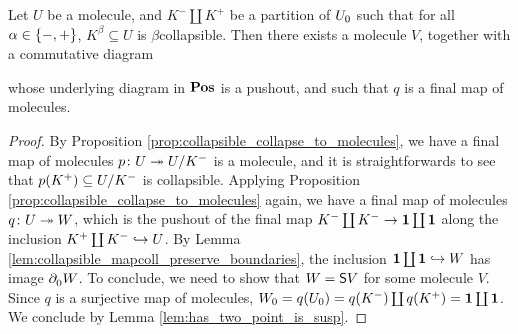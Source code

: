 \begin{prop} \label{prop:desuspension}
    Let \( U \) be a molecule, and \( K^- \coprod K^+ \) be a partition of \( \gr{0}{U} \) such that for all \( \a \in \set{-, +} \), \( K^\beta \subseteq U \) is \( \beta \)\nbd collapsible.
    Then there exists a molecule \( V \), together with a commutative diagram
    \begin{center}
    \end{center}
    whose underlying diagram in \( \Pos \) is a pushout, and such that \( q \) is a final map of molecules.
\end{prop}
\begin{proof}
    By Proposition \ref{prop:collapsible_collapse_to_molecules}, we have a final map of molecules \( p \colon U \surj \coll{K^-}{U} \) is a molecule, and it is straightforwards to see that \( p(K^+) \subseteq \coll{K^-}{U} \) is collapsible.
    Applying Proposition \ref{prop:collapsible_collapse_to_molecules} again, we have a final map of molecules \( q \colon U \surj W \), which is the pushout of the final map \( K^- \coprod K^- \to \pt \coprod \pt \) along the inclusion \( K^+ \coprod K^- \incl U \).
    By Lemma \ref{lem:collapsible_mapcoll_preserve_boundaries}, the inclusion \( \pt \coprod \pt \incl W \) has image \( \bd{0}{} W \).
    To conclude, we need to show that \( W = \sus{V} \) for some molecule \( V \).
    Since \( q \) is a surjective map of molecules, \( \gr{0}{W} = q(\gr{0}{U}) = q(K^-) \coprod q(K^+) = \pt \coprod \pt \).
    We conclude by Lemma \ref{lem:has_two_point_is_susp}.
\end{proof}

